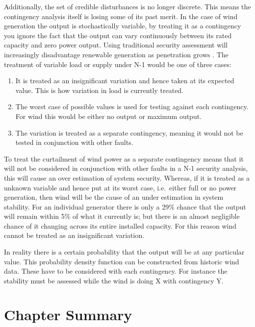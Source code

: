 \documentclass[a4paper,oneside,12pt]{report}
\begin{document}
Additionally, the set of credible disturbances is no longer discrete. This means the contingency analysis itself is losing some of its past merit. In the case of wind generation the output is stochastically variable, by treating it as a contingency you ignore the fact that the output can vary continuously between its rated capacity and zero power output. Using traditional security assessment will increasingly disadvantage renewable generation as penetration grows \cite{BWEA2006}. The treatment of variable load or supply under N-1 would be one of three cases:

\begin{enumerate}
  \item It is treated as an insignificant variation and hence taken at its expected value. This is how variation in load is currently treated.
  \item The worst case of possible values is used for testing against each contingency. For wind this would be either no output or maximum output.
  \item The variation is treated as a separate contingency, meaning it would not be tested in conjunction with other faults.
\end{enumerate}

To treat the curtailment of wind power as a separate contingency means that it will not be considered in conjunction with other faults in a N-1 security analysis, this will cause an over estimation of system security. Whereas, if it is treated as a unknown variable and hence put at its worst case, i.e.\ either full or no power generation, then wind will be the cause of an under estimation in system stability. For an individual generator there is only a 29\% chance that the output will remain within 5\% of what it currently is; but there is an almost negligible chance of it changing across its entire installed capacity. For this reason wind cannot be treated as an insignificant variation.

In reality there is a certain probability that the output will be at any particular value. This probability density function can be constructed from historic wind data. These have to be considered with each contingency. For instance the stability must be assessed while the wind is doing X with contingency Y.

\section{Chapter Summary}
\end{document}

